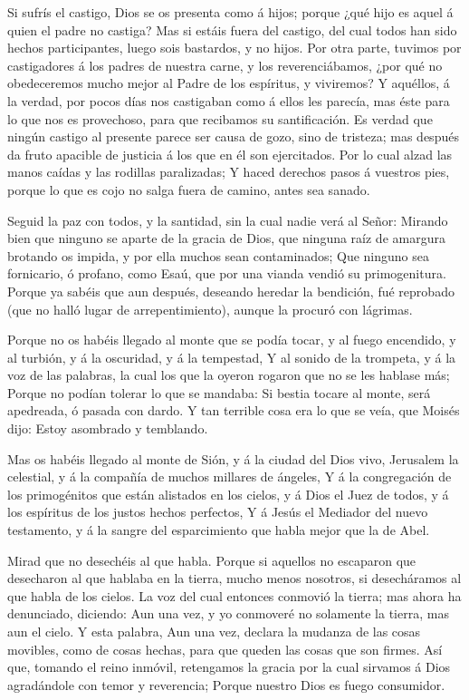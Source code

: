 Si sufrís el castigo, Dios se os presenta como á hijos;
porque ¿qué hijo es aquel á quien el padre no castiga?  Mas
si estáis fuera del castigo, del cual todos han sido hechos
participantes, luego sois bastardos, y no hijos.  Por otra
parte, tuvimos por castigadores á los padres de nuestra carne, y los
reverenciábamos, ¿por qué no obedeceremos mucho mejor al Padre de los
espíritus, y viviremos?  Y aquéllos, á la verdad, por pocos
días nos castigaban como á ellos les parecía, mas éste para lo que nos
es provechoso, para que recibamos su santificación.  Es
verdad que ningún castigo al presente parece ser causa de gozo, sino de
tristeza; mas después da fruto apacible de justicia á los que en él son
ejercitados.  Por lo cual alzad las manos caídas y las
rodillas paralizadas;  Y haced derechos pasos á vuestros
pies, porque lo que es cojo no salga fuera de camino, antes sea sanado.

 Seguid la paz con todos, y la santidad, sin la cual nadie
verá al Señor:  Mirando bien que ninguno se aparte de la
gracia de Dios, que ninguna raíz de amargura brotando os impida, y por
ella muchos sean contaminados;  Que ninguno sea fornicario,
ó profano, como Esaú, que por una vianda vendió su primogenitura.
 Porque ya sabéis que aun después, deseando heredar la
bendición, fué reprobado (que no halló lugar de arrepentimiento), aunque
la procuró con lágrimas.

 Porque no os habéis llegado al monte que se podía tocar, y
al fuego encendido, y al turbión, y á la oscuridad, y á la tempestad,
 Y al sonido de la trompeta, y á la voz de las palabras, la
cual los que la oyeron rogaron que no se les hablase más; 
Porque no podían tolerar lo que se mandaba: Si bestia tocare al monte,
será apedreada, ó pasada con dardo.  Y tan terrible cosa
era lo que se veía, que Moisés dijo: Estoy asombrado y temblando.

 Mas os habéis llegado al monte de Sión, y á la ciudad del
Dios vivo, Jerusalem la celestial, y á la compañía de muchos millares de
ángeles,  Y á la congregación de los primogénitos que están
alistados en los cielos, y á Dios el Juez de todos, y á los espíritus de
los justos hechos perfectos,  Y á Jesús el Mediador del
nuevo testamento, y á la sangre del esparcimiento que habla mejor que la
de Abel.

 Mirad que no desechéis al que habla. Porque si aquellos no
escaparon que desecharon al que hablaba en la tierra, mucho menos
nosotros, si desecháramos al que habla de los cielos.  La
voz del cual entonces conmovió la tierra; mas ahora ha denunciado,
diciendo: Aun una vez, y yo conmoveré no solamente la tierra, mas aun el
cielo.  Y esta palabra, Aun una vez, declara la mudanza de
las cosas movibles, como de cosas hechas, para que queden las cosas que
son firmes.  Así que, tomando el reino inmóvil, retengamos
la gracia por la cual sirvamos á Dios agradándole con temor y
reverencia;  Porque nuestro Dios es fuego consumidor.


